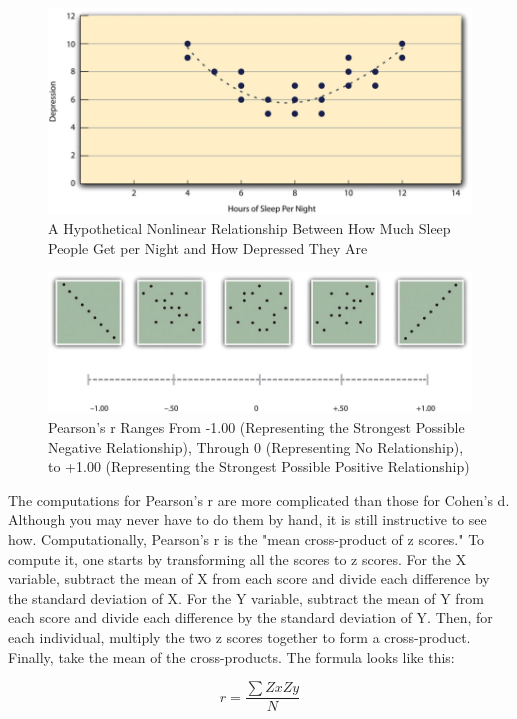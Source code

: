 \begin{figure}
\includegraphics[width=.7\linewidth]{figures/Fig12-8}
\caption{A Hypothetical Nonlinear Relationship Between How Much Sleep People Get per Night and How Depressed They Are}
\label{fig:nonlinear}
\end{figure}

\begin{figure}
\includegraphics[width=\linewidth]{figures/Fig12-9}
\caption{ Pearson's r Ranges From -1.00 (Representing the Strongest Possible Negative Relationship), Through 0 (Representing No Relationship), to +1.00 (Representing the Strongest Possible Positive Relationship)}
\label{fig:pearsons}
\end{figure}


The computations for Pearson's r are more complicated than those for Cohen's d. Although you may never have to do them by hand, it is still instructive to see how. Computationally, Pearson's r is the "mean cross-product of z scores." To compute it, one starts by transforming all the scores to z scores. For the X variable, subtract the mean of X from each score and divide each difference by the standard deviation of X. For the Y variable, subtract the mean of Y from each score and divide each difference by the standard deviation of Y. Then, for each individual, multiply the two z scores together to form a cross-product. Finally, take the mean of the cross-products. The formula looks like this:

\begin{equation}
r = \frac{\sum ZxZy}{N}
\end{equation}

